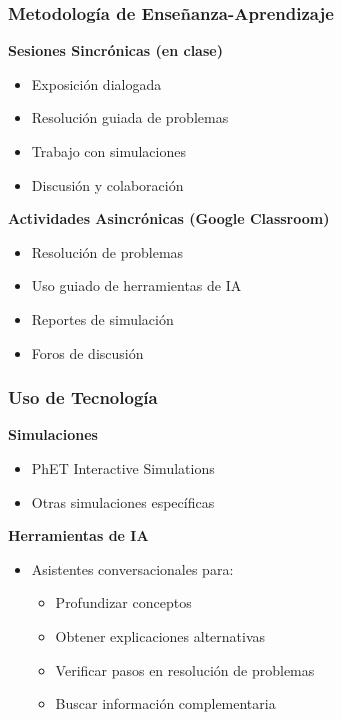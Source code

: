 \documentclass{beamer}
\begin{document}
\begin{frame}
    \frametitle{Metodología de Enseñanza-Aprendizaje}
    
    \textbf{Sesiones Sincrónicas (en clase)}
    \begin{itemize}
        \item Exposición dialogada
        \item Resolución guiada de problemas
        \item Trabajo con simulaciones
        \item Discusión y colaboración
    \end{itemize}
    \vspace{0.3cm}
    
    \textbf{Actividades Asincrónicas (Google Classroom)}
    \begin{itemize}
        \item Resolución de problemas
        \item Uso guiado de herramientas de IA
        \item Reportes de simulación
        \item Foros de discusión
    \end{itemize}
\end{frame}

\begin{frame}
    \frametitle{Uso de Tecnología}
    
    \textbf{Simulaciones}
    \begin{itemize}
        \item PhET Interactive Simulations
        \item Otras simulaciones específicas
    \end{itemize}
    \vspace{0.3cm}
    
    \textbf{Herramientas de IA}
    \begin{itemize}
        \item Asistentes conversacionales para:
        \begin{itemize}
            \item Profundizar conceptos
            \item Obtener explicaciones alternativas
            \item Verificar pasos en resolución de problemas
            \item Buscar información complementaria
        \end{itemize}
    \end{itemize}
\end{frame}
\end{document}

